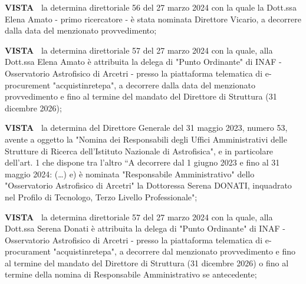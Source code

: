 \textbf{VISTA~} la determina direttoriale 56 del 27 marzo 2024 con la quale
la Dott.ssa Elena Amato - primo ricercatore - è stata nominata
Direttore Vicario, a decorrere dalla data del menzionato provvedimento;

\textbf{VISTA~} la determina direttoriale 57 del 27 marzo 2024 con la quale, alla
Dott.ssa Elena Amato è attribuita la delega di "Punto Ordinante" di
INAF - Osservatorio Astrofisico di Arcetri - presso la piattaforma
telematica di e-procurement "acquistinretepa", a decorrere dalla
data del menzionato provvedimento e fino al termine del mandato del
Direttore di Struttura (31 dicembre 2026);

\textbf{VISTA~} la determina del Direttore Generale del 31 maggio 2023, numero
53, avente a oggetto la "Nomina dei Responsabili degli Uffici
Amministrativi delle Strutture di Ricerca dell’Istituto Nazionale
di Astrofisica", e in particolare dell’art. 1 che dispone tra
l’altro “A decorrere dal 1 giugno 2023 e fino al 31 maggio 2024:
(…) e) è nominata "Responsabile Amministrativo" dello "Osservatorio
Astrofisico di Arcetri" la Dottoressa Serena DONATI, inquadrato nel
Profilo di Tecnologo, Terzo Livello Professionale";

\textbf{VISTA~} la determina direttoriale 57 del 27 marzo 2024 con la quale, alla
Dott.ssa Serena Donati è attribuita la delega di "Punto Ordinante" di
INAF - Osservatorio Astrofisico di Arcetri - presso la piattaforma
telematica di e-procurament "acquistinretepa", a decorrere dal
menzionato provvedimento e fino al termine del mandato del Direttore
di Struttura (31 dicembre 2026) o fino al termine della nomina di
Responsabile Amministrativo se antecedente;

